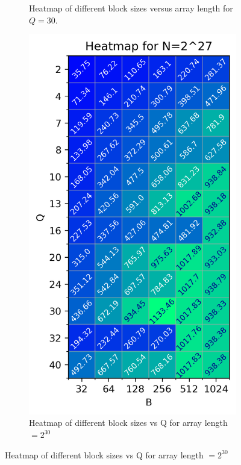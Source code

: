 \documentclass[twocolumn]{article}
\begin{document}
\begin{figure}[h]
\begin{subfigure}{0.31\linewidth}
        \caption{Heatmap of different block sizes versus array length for $Q=30$.}
        \label{fig:heatmap-q}
    \end{subfigure}
    \begin{subfigure}{0.31\linewidth}
        \includegraphics[width=\linewidth]{report/plots/heatmap_BvQ_N=28.png}
        \caption{Heatmap of different block sizes vs Q for array length $=2^{30}$}
        \label{fig:heatmap-n}

\end{subfigure}
\end{figure}
\end{document}
